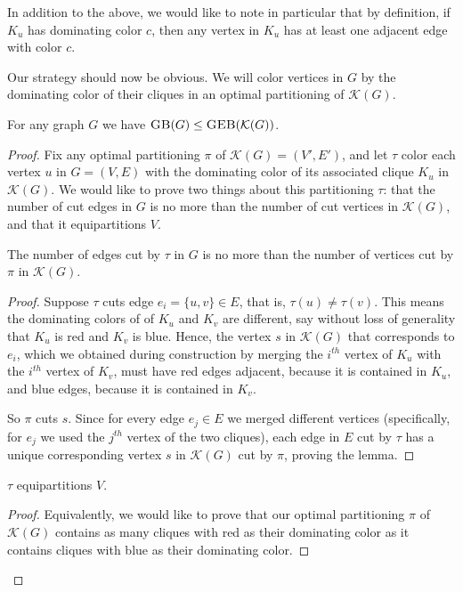 \documentclass{article}
\newcommand{\sgeb}{\textsc{GEB} }
\newcommand{\sgb}{\textsc{GB} }
\begin{document}
	In addition to the above, we would like to note in particular that by
	definition, if $K_u$ has dominating color $c$, then any vertex in $K_u$
	has at least one adjacent edge with color $c$.

	Our strategy should now be obvious. We will color vertices in $G$ by
	the dominating color of their cliques in an optimal partitioning of
	$\mathcal{K}(G)$.

	\begin{proposition}
		\label{gb-leq-geb}
		For any graph $G$ we have $\sgb(G) \leq \sgeb(\mathcal{K}(G))$.
	\end{proposition}
	\begin{proof}
		Fix any optimal partitioning $\pi$ of $\mathcal{K}(G) = (V', E')$, and
		let $\tau$ color each vertex $u$ in $G = (V, E)$ with the dominating
		color of its associated clique $K_u$ in $\mathcal{K}(G)$. We would
		like to
		prove two things about this partitioning $\tau$:
		that the number of cut edges in $G$ is no more than the number of
		cut vertices in $\mathcal{K}(G)$, and that it equipartitions $V$.


		\begin{lemma}
			\label{gb-leq-geb-lemma-1}
			The number of edges cut by $\tau$ in $G$ is no more than the number
			of vertices cut by $\pi$ in $\mathcal{K}(G)$.
		\end{lemma}
		\begin{proof}
			Suppose $\tau$ cuts edge $e_i = \{u, v\} \in E$, that is,
			$\tau(u) \neq \tau(v)$. This means the dominating colors of
			of $K_u$ and $K_v$ are different, say without loss of generality
			that $K_u$ is red and $K_v$ is blue. Hence, the vertex $s$ in
			$\mathcal{K}(G)$ that
			corresponds to $e_i$, which we obtained during construction
			by merging the $i^{th}$
			vertex of $K_u$ with the $i^{th}$ vertex of $K_v$, must have
			red edges adjacent, because it is contained in $K_u$, and blue
			edges, because it is contained in $K_v$.

			So $\pi$ cuts $s$.
			Since for every edge $e_j \in E$ we merged different
			vertices (specifically, for $e_j$ we used the $j^{th}$ vertex of
			the two cliques), each edge in $E$ cut by $\tau$ has a unique
			corresponding vertex $s$ in $\mathcal{K}(G)$ cut by $\pi$,
			proving the lemma.
		\end{proof}
		\begin{lemma}
			\label{gb-leq-geb-lemma-2}
			$\tau$ equipartitions $V$.
		\end{lemma}
		\begin{proof}
			Equivalently, we would like to prove that our optimal partitioning
			$\pi$ of $\mathcal{K}(G)$ contains as many cliques with red as
			their dominating color as it contains cliques with blue as their
			dominating color.


\end{proof}
\end{proof}
\end{document}
